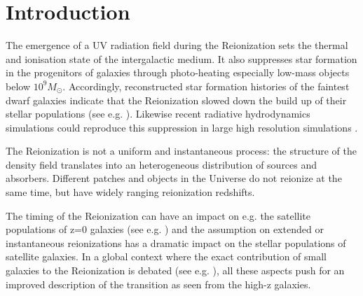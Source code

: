 \documentclass[twocolumn]{aastex61}
\begin{document}

\section{Introduction}
The emergence of a UV radiation field during the Reionization sets the thermal and ionisation state of the intergalactic medium. It also suppresses star formation in the progenitors of galaxies through photo-heating especially low-mass objects below $10^9 M_\odot$. Accordingly, reconstructed star formation histories of the faintest dwarf galaxies indicate that the Reionization slowed down the build up of their stellar populations (see e.g. \citet{BROWN14}). Likewise recent radiative hydrodynamics simulations could reproduce this suppression in large high resolution simulations \citep{OCV16}. 

The Reionization is not a uniform and instantaneous process: the structure of the density field translates into an heterogeneous distribution of sources and absorbers. Different patches and objects in the Universe do not reionize at the same time, but have widely ranging reionization redshifts. 

The timing of the Reionization can have an impact on e.g. the satellite populations of z=0 galaxies (see e.g. \citet{KOP9,BUS10,OCV11,ILI11,OCV14,GIL15})
and the assumption on extended or instantaneous reionizations has a dramatic impact on the stellar populations of satellite galaxies. In a global context where the exact contribution of small galaxies to the Reionization is debated (see e.g. \citet{BOU14,FIN15}), all these aspects push for an improved description of the transition as seen from the high-z galaxies. 
\end{document}

